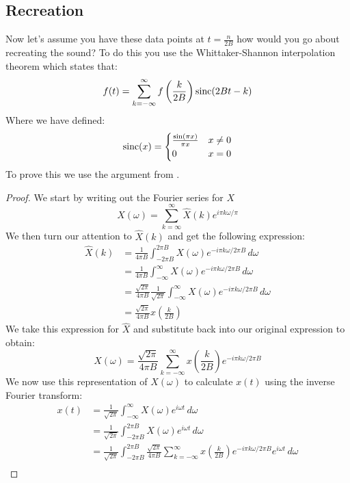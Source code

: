 \documentclass [../article.tex]{subfiles}
\begin{document}
  \subsection{Recreation}
  Now let's assume you have these data points at $t=\frac{n}{2B}$
  how would you go about recreating the sound? To do this you use
  the Whittaker-Shannon interpolation theorem which states that:
  \[f(t) = \sum_{k=-\infty}^\infty f\left(\frac{k}{2B}\right)\operatorname{sinc}(2Bt-k)\]
  Where we have defined:
  \[\operatorname{sinc}(x) = \begin{cases}
                  \frac{\sin(\pi x)}{\pi x} & x \neq 0\\
                  0 & x = 0
                \end{cases} \]
  To prove this we use the argument from \cite{vrscay_2008}.
  \begin{proof}
    We start by writing out the Fourier series for $X$
    \[X(\omega)=\sum_{k=\infty}^\infty\hat{X}(k)e^{i\pi k\omega/\pi}\]
    We then turn our attention to $\hat{X}(k)$ and get the following
    expression:
    \begin{align*}
      \hat{X}(k) &= \frac{1}{{4\pi B}}\int_{-{2\pi B}}^{2\pi B} X(\omega)
      e^{-i\pi k \omega/{2\pi B}}\,d\omega\\
      {} &= \frac{1}{{4\pi B}}\int_{-\infty}^\infty X(\omega)
      e^{-i\pi k \omega/{2\pi B}}\,d\omega\\
      {} &= \frac{\sqrt{2\pi}}{{4\pi B}}\frac{1}{\sqrt{2\pi}}
      \int_{-\infty}^\infty X(\omega) e^{-i\pi k \omega/{2\pi B}}\,d\omega\\
      {} &= \frac{\sqrt{2\pi}}{{4\pi B}}x\left(\frac{k}{2B}\right)
    \end{align*}
    We take this expression for $\hat{X}$ and substitute back
    into our original expression to obtain:
    \[ X(\omega) = \frac{\sqrt{2\pi}}{{4\pi B}}\sum_{k=-\infty}^\infty
    x\left(\frac{k}{2B}\right)e^{-i\pi k\omega/{2\pi B}}\]
    We now use this representation of $X(\omega)$ to calculate
    $x(t)$ using the inverse Fourier transform:
    \begin{align*}
      x(t) &= \frac{1}{\sqrt{2\pi}}\int_{-\infty}^\infty X(\omega) e^{i\omega t}\,d\omega\\
      {} &= \frac{1}{\sqrt{2\pi}}\int_{-{2\pi B}}^{2\pi B} X(\omega) e^{i\omega t}\,d\omega\\
      {} &= \frac{1}{\sqrt{2\pi}}\int_{-{2\pi B}}^{2\pi B} \frac{\sqrt{2\pi}}{{4\pi B}}\sum_{k=-\infty}^\infty
      x\left(\frac{k}{2B}\right)e^{-i\pi k\omega/{2\pi B}} e^{i\omega t}\,d\omega\\

\end{align*}
\end{proof}
\end{document}
